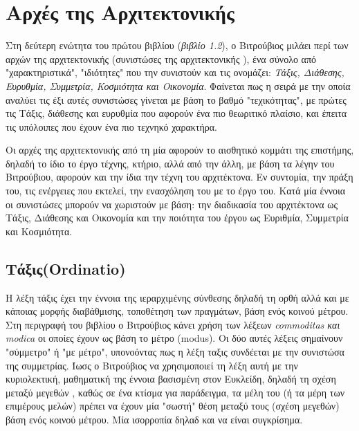 \section{Αρχές της Αρχιτεκτονικής}

Στη δεύτερη ενώτητα του πρώτου βιβλίου (\emph{βιβλίο 1.2}), ο Βιτρούβιος μιλάει περί των αρχών της αρχιτεκτονικής (συνιστώσες της αρχιτεκτονικής \cite{vitruvius-lefas}), ένα σύνολο από "χαρακτηριστικά", "ιδιότητες" που την συνιστούν και τις ονομάζει: \emph{Τάξις, Διάθεσης, Ευρυθμία, Συμμετρία, Κοσμιότητα και Οικονομία}. Φαίνεται πως η σειρά με την οποία αναλύει τις έξι αυτές συνιστώσες γίνεται με βάση το βαθμό "τεχικότητας", με πρώτες τις Τάξις, διάθεσης και ευρυθμία που αφορούν ένα πιο θεωριτικό πλαίσιο, και έπειτα τις υπόλοιπες που έχουν ένα πιο τεχνηκό χαρακτήρα. \cite[σ.~49,91-92]{vitruvius-lefas}
 
Οι αρχές της αρχιτεκτονικής από τη μία αφορούν το αισθητικό κομμάτι της επιστήμης, δηλαδή το ίδιο το έργο τέχνης, κτήριο, αλλά από την άλλη, με βάση τα λέγην του Βιτρούβιου, αφορούν και την ίδια την τέχνη του αρχιτέκτονα. Εν συντομία, την πράξη του, τις ενέργειες που εκτελεί, την ενασχόληση του με το έργο του. Κατά μία έννοια οι συνιστώσες μπορούν να χωριστούν με βάση: την διαδικασία του αρχιτέκτονα ως Τάξις, Διάθεσης και Οικονομία και την ποιότητα του έργου ως Ευριθμία, Συμμετρία και Κοσμιότητα.


 
\subsection{Τάξις(Ordinatio)}
  
Η λέξη τάξις έχει την έννοια της ιεραρχιμένης σύνθεσης δηλαδή τη ορθή αλλά και με κάποιας μορφής διαβάθμισης, τοποθέτηση των πραγμάτων, βάση ενός κοινού μέτρου. \cite[σ.~92]{vitruvius-lefas} Στη περιγραφή του βιβλίου ο Βιτρούβιος κάνει χρήση των λέξεων \emph{commoditas και modica} οι οποίες έχουν ως βάση το μέτρο (modus). Οι δύο αυτές λέξεις σημαίνουν "σύμμετρο" ή "με μέτρο", υπονοόντας πως η λέξη ταξις συνδέεται με την συνιστώσα της συμμετρίας. Ίωσς ο Βιτρούβιος να χρησιμοποιεί τη λέξη αυτή με την κυριολεκτική, μαθηματική της έννοια βασισμένη στον Ευκλείδη, δηλαδή τη σχέση μεταξύ μεγεθών \cite[σ.~186]{lefas-fundamental}, καθώς σε ένα κτίσμα για παράδειγμα, τα μέλη του (ή τα μέρη των επιμέρους μελών) πρέπει να έχουν μία "σωστή" θέση μεταξύ τους (σχέση μεγεθών) βάση ενός κοινού μέτρου. Μία ισορροπία δηλαδ και να είναι συγκρίσημα.\cite[σ.~92]{vitruvius-lefas}

